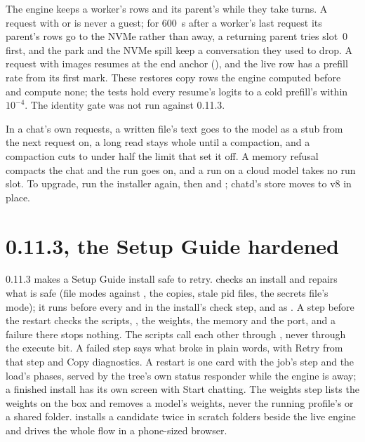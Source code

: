 The engine keeps a worker's rows and its parent's while they take turns. A request with  or  is never a guest; for 600~s after a worker's last request its parent's rows go to the NVMe rather than away, a returning parent tries slot~0 first, and the park and the NVMe spill keep a conversation they used to drop. A request with images resumes at the end anchor (), and the live row has a prefill rate from its first mark. These restores copy rows the engine computed before and compute none; the tests hold every resume's logits to a cold prefill's within $10^{-4}$. The identity gate was not run against 0.11.3.

In a chat's own requests, a written file's text goes to the model as a stub from the next request on, a long read stays whole until a compaction, and a compaction cuts to under half the limit that set it off. A memory refusal compacts the chat and the run goes on, and a run on a cloud model takes no run slot. To upgrade, run the installer again, then  and ; chatd's store moves to v8 in place.

\section{0.11.3, the Setup Guide hardened}\label{sec:changelog-0113}

0.11.3 makes a Setup Guide install safe to retry.  checks an install and repairs what is safe (file modes against , the  copies, stale pid files, the secrets file's mode); it runs before every  and in the install's check step, and as . A step before the restart checks the scripts, , the weights, the memory and the port, and a failure there stops nothing. The scripts call each other through , never through the execute bit. A failed step says what broke in plain words, with Retry from that step and Copy diagnostics. A restart is one card with the job's step and the load's phases, served by the tree's own status responder while the engine is away; a finished install has its own screen with Start chatting. The weights step lists the weights on the box and removes a model's weights, never the running profile's or a shared folder.  installs a candidate twice in scratch folders beside the live engine and drives the whole flow in a phone-sized browser.

